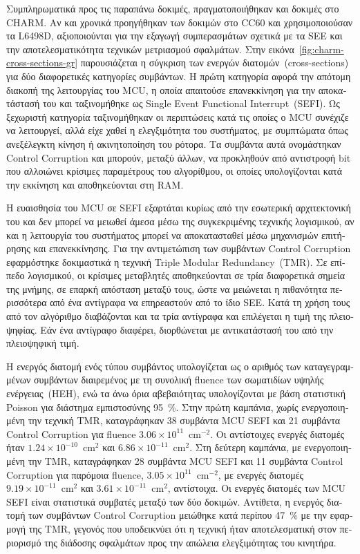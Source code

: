 \begin{greek}
Συμπληρωματικά προς τις παραπάνω δοκιμές, πραγματοποιήθηκαν και δοκιμές στο CHARM. Αν και χρονικά προηγήθηκαν των δοκιμών στο CC60 και χρησιμοποιούσαν τα L6498D, αξιοποιούνται για την εξαγωγή συμπερασμάτων σχετικά με τα SEE και την αποτελεσματικότητα τεχνικών μετριασμού σφαλμάτων. Στην εικόνα~\ref{fig:charm-cross-sections-gr} παρουσιάζεται η σύγκριση των ενεργών διατομών~(cross-sections) για δύο διαφορετικές κατηγορίες συμβάντων. Η πρώτη κατηγορία αφορά την απότομη διακοπή της λειτουργίας του MCU, η οποία απαιτούσε επανεκκίνηση για την αποκατάστασή του και ταξινομήθηκε ως Single Event Functional Interrupt~(SEFI). Ως ξεχωριστή κατηγορία ταξινομήθηκαν οι περιπτώσεις κατά τις οποίες ο MCU συνέχιζε να λειτουργεί, αλλά είχε χαθεί η ελεγξιμότητα του συστήματος, με συμπτώματα όπως ανεξέλεγκτη κίνηση ή ακινητοποίηση του ρότορα. Τα συμβάντα αυτά ονομάστηκαν Control Corruption και μπορούν, μεταξύ άλλων, να προκληθούν από αντιστροφή bit που αλλοιώνει κρίσιμες παραμέτρους του αλγορίθμου, οι οποίες υπολογίζονται κατά την εκκίνηση και αποθηκεύονται στη RAM.

Η ευαισθησία του MCU σε SEFI εξαρτάται κυρίως από την εσωτερική αρχιτεκτονική του και δεν μπορεί να μειωθεί άμεσα μέσω της συγκεκριμένης τεχνικής λογισμικού, αν και η λειτουργία του συστήματος μπορεί να αποκατασταθεί μέσω μηχανισμών επιτήρησης και επανεκκίνησης. Για την αντιμετώπιση των συμβάντων Control Corruption εφαρμόστηκε δοκιμαστικά η τεχνική Triple Modular Redundancy~(TMR). Σε επίπεδο λογισμικού, οι κρίσιμες μεταβλητές αποθηκεύονται σε τρία διαφορετικά σημεία της μνήμης, σε επαρκή απόσταση μεταξύ τους, ώστε να μειώνεται η πιθανότητα περισσότερα από ένα αντίγραφα να επηρεαστούν από το ίδιο SEE. Κατά τη χρήση τους από τον αλγόριθμο διαβάζονται και τα τρία αντίγραφα και επιλέγεται η τιμή της πλειοψηφίας. Εάν ένα αντίγραφο διαφέρει, διορθώνεται με αντικατάστασή του από την πλειοψηφική τιμή.

Η ενεργός διατομή ενός τύπου συμβάντος υπολογίζεται ως ο αριθμός των καταγεγραμμένων συμβάντων διαιρεμένος με τη συνολική fluence των σωματιδίων υψηλής ενέργειας~(HEH), ενώ τα άνω όρια αβεβαιότητας υπολογίζονται με βάση στατιστική Poisson για διάστημα εμπιστοσύνης 95~\%. Στην πρώτη καμπάνια, χωρίς ενεργοποιημένη την τεχνική TMR, καταγράφηκαν 38 συμβάντα MCU SEFI και 21 συμβάντα Control Corruption για fluence $3.06\times10^{11}$~cm$^{-2}$. Οι αντίστοιχες ενεργές διατομές ήταν $1.24\times10^{-10}$~cm$^{2}$ και $6.86\times10^{-11}$~cm$^{2}$. Στη δεύτερη καμπάνια, με ενεργοποιημένη την TMR, καταγράφηκαν 28 συμβάντα MCU SEFI και 11 συμβάντα Control Corruption για παρόμοια fluence, $3.05\times10^{11}$~cm$^{-2}$, με ενεργές διατομές $9.19\times10^{-11}$~cm$^{2}$ και $3.61\times10^{-11}$~cm$^{2}$, αντίστοιχα. Οι ενεργές διατομές των MCU SEFI είναι στατιστικά συμβατές μεταξύ των δύο δοκιμών. Αντίθετα, η ενεργός διατομή των συμβάντων Control Corruption μειώθηκε κατά περίπου 47~\% με την εφαρμογή της TMR, γεγονός που υποδεικνύει ότι η τεχνική ήταν αποτελεσματική στον περιορισμό της διάδοσης σφαλμάτων προς την απώλεια ελεγξιμότητας του κινητήρα.


\end{greek}
